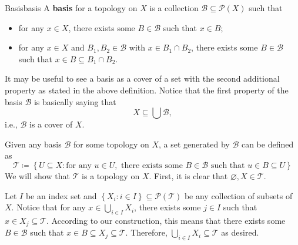 \documentclass[math, code]{amznotes}
\theoremstyle{remark}
\begin{document}
\begin{dfnbox}{Basis}{basis}
    A {\color{red} \textbf{basis}} for a topology on $X$ is a collection $\mathcal{B} \subseteq \mathcal{P}\left(X\right)$ such that 
    \begin{itemize}
        \item for any $x \in X$, there exists some $B \in \mathcal{B}$ such that $x \in B$;
        \item for any $x \in X$ and $B_1, B_2 \in \mathcal{B}$ with $x \in B_1 \cap B_2$, there exists some $B \in \mathcal{B}$ such that $x \in B \subseteq B_1 \cap B_2$.
    \end{itemize}
\end{dfnbox}
It may be useful to see a basis as a cover of a set with the second additional property as stated in the above definition. Notice that the first property of the basis $\mathcal{B}$ is basically saying that 
\begin{equation*}
    X \subseteq \bigcup \mathcal{B},
\end{equation*}
i.e., $\mathcal{B}$ is a cover of $X$.

Given any basis $\mathcal{B}$ for some topology on $X$, a set generated by $\mathcal{B}$ can be defined as 
\begin{equation*}
    \mathcal{T} \coloneqq \left\{U \subseteq X \colon \textrm{for any } u \in U, \textrm{ there exists some } B \in \mathcal{B} \textrm{ such that } u \in B \subseteq U\right\}
\end{equation*}
We will show that $\mathcal{T}$ is a topology on $X$. First, it is clear that $\varnothing, X \in \mathcal{T}$. 

Let $I$ be an index set and $\left\{X_i \colon i \in I\right\}\subseteq \mathcal{P}\left(\mathcal{T}\right)$ be any collection of subsets of $X$. Notice that for any $x \in \bigcup_{i \in I}X_i$, there exists some $j \in I$ such that $x \in X_j \subseteq \mathcal{T}$. According to our construction, this means that there exists some $B \in \mathcal{B}$ such that $x \in B \subseteq X_j \subseteq \mathcal{T}$. Therefore, $\bigcup_{i \in I}X_i \subseteq \mathcal{T}$ as desired.
\end{document}
